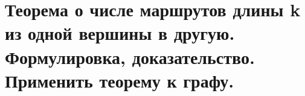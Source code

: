 \section{Теорема о числе маршрутов длины k из одной вершины в другую. Формулировка, 
доказательство. Применить теорему к графу.}

